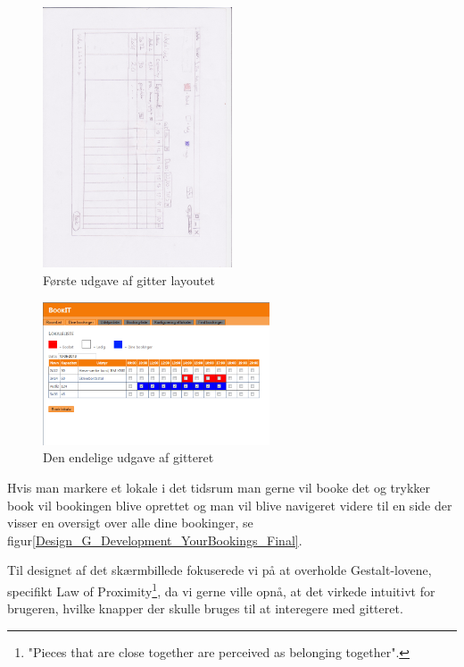 \begin{figure}[h!]
  \centering
    \includegraphics[angle=90, width=0.5\textwidth]{Appendix/GUI-Prototype/PaperMockup/LokaleListe_001}
  \caption{Første udgave af gitter layoutet}
\label{Design_G_Development_FirstGrid}
\end{figure}

\begin{figure}[h!]
  \centering
    \includegraphics[width=0.6\textwidth]{Appendix/GUI-Prototype/DigitalMockup/GridEksempel}
  \caption{Den endelige udgave af gitteret}
\label{Design_G_Development_FinalGrid}
\end{figure}

Hvis man markere et lokale i det tidsrum man gerne vil booke det og trykker book vil bookingen blive oprettet og man vil blive navigeret videre til en side der visser en oversigt over alle dine bookinger, se figur\ref{Design_G_Development_YourBookings_Final}. 

Til designet af det skærmbillede fokuserede vi på at overholde Gestalt-lovene\cite[s. 68]{SL_UID}, specifikt Law of Proximity\footnote{"Pieces that are close together are perceived as belonging together".}, da vi gerne ville opnå, at det virkede intuitivt for brugeren, hvilke knapper der skulle bruges til at interegere med gitteret. 

